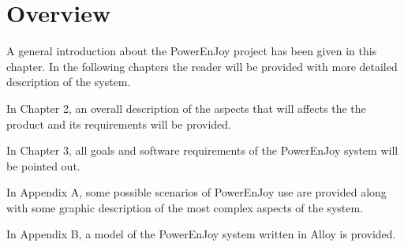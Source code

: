 \section{Overview}

A general introduction about the PowerEnJoy project has been given in this chapter. In the following chapters the reader will be provided with more detailed description of the system.

In Chapter 2, an overall description of the aspects that will affects the the product and its requirements will be provided.

In Chapter 3, all goals and software requirements of the PowerEnJoy system will be pointed out.

In Appendix A, some possible scenarios of PowerEnJoy use are provided along with some graphic description of the most complex aspects of the system.

In Appendix B, a model of the PowerEnJoy system written in Alloy \cite{alloy} is provided. 